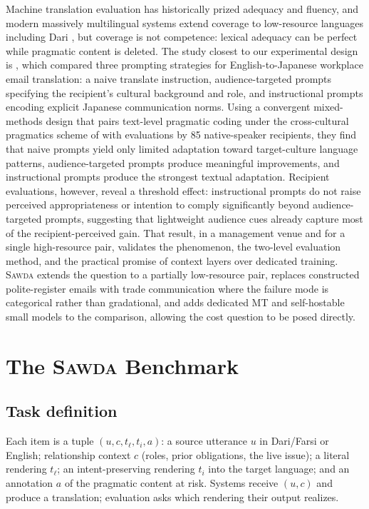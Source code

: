 \documentclass[11pt]{article}
\newcommand{\bench}{\textsc{Sawda}}
\begin{document}
Machine translation evaluation has historically prized adequacy and fluency, and modern massively multilingual systems extend coverage to low-resource languages including Dari \citep{nllb2022}, but coverage is not competence: lexical adequacy can be perfect while pragmatic content is deleted. The study closest to our experimental design is \citet{tenzer2026pragmatics}, which compared three prompting strategies for English-to-Japanese workplace email translation: a naive translate instruction, audience-targeted prompts specifying the recipient's cultural background and role, and instructional prompts encoding explicit Japanese communication norms. Using a convergent mixed-methods design that pairs text-level pragmatic coding under the cross-cultural pragmatics scheme of \citet{housekadar2021} with evaluations by 85 native-speaker recipients, they find that naive prompts yield only limited adaptation toward target-culture language patterns, audience-targeted prompts produce meaningful improvements, and instructional prompts produce the strongest textual adaptation. Recipient evaluations, however, reveal a threshold effect: instructional prompts do not raise perceived appropriateness or intention to comply significantly beyond audience-targeted prompts, suggesting that lightweight audience cues already capture most of the recipient-perceived gain. That result, in a management venue and for a single high-resource pair, validates the phenomenon, the two-level evaluation method, and the practical promise of context layers over dedicated training. \bench{} extends the question to a partially low-resource pair, replaces constructed polite-register emails with trade communication where the failure mode is categorical rather than gradational, and adds dedicated MT and self-hostable small models to the comparison, allowing the cost question to be posed directly.

\section{The \bench{} Benchmark}

\subsection{Task definition}
Each item is a tuple $(u, c, t_{\ell}, t_{i}, a)$: a source utterance $u$ in Dari/Farsi or English; relationship context $c$ (roles, prior obligations, the live issue); a literal rendering $t_{\ell}$; an intent-preserving rendering $t_{i}$ into the target language; and an annotation $a$ of the pragmatic content at risk. Systems receive $(u, c)$ and produce a translation; evaluation asks which rendering their output realizes.
\end{document}
